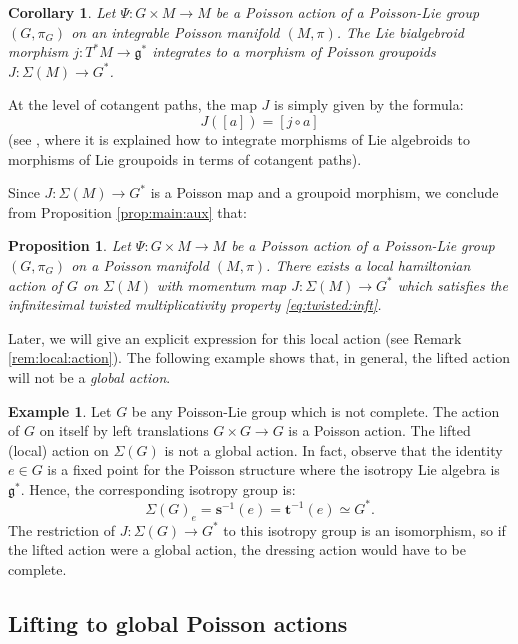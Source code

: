 \documentclass[a4paper,11pt]{amsart}
\newtheorem{prop}[thm]{Proposition}
\newtheorem{cor}[thm]{Corollary}
\theoremstyle{definition}
\newtheorem{ex}[thm]{Example}
\theoremstyle{remark}
\begin{document}
\begin{cor}
\label{cor:integ:J} Let $\Psi:G\times M\to M$ be a Poisson action
of a Poisson-Lie group $(G,\pi_G)$ on an integrable Poisson
manifold $(M,\pi)$. The Lie bialgebroid morphism $j:T^*M\to{\mathfrak{g}}^*$
integrates to a morphism of Poisson groupoids $J:\Sigma(M)\to
G^*$.
\end{cor}

At the level of cotangent paths, the map $J$ is simply given by the formula:
\[ J([a])=[j\circ a]\]
(see \cite{CrFe}, where it is explained how to integrate morphisms
of Lie algebroids to morphisms of Lie groupoids in terms of
cotangent paths).

Since $J:\Sigma(M)\to G^*$ is a Poisson map and a groupoid morphism, we conclude from Proposition \ref{prop:main:aux} that:

\begin{prop}
\label{prop:local:act}
Let $\Psi:G\times M\to M$ be a Poisson action of a Poisson-Lie
group $(G,\pi_G)$ on a Poisson manifold $(M,\pi)$. There exists a
local hamiltonian action of $G$ on $\Sigma(M)$ with momentum map
$J:\Sigma(M)\to G^*$ which satisfies the infinitesimal twisted
multiplicativity property \eqref{eq:twisted:inft}.
\end{prop}

Later, we will give an explicit expression for this local action (see Remark \ref{rem:local:action}).
The following example shows that, in general, the lifted action will not be a \emph{global action}.

\begin{ex}
Let $G$ be any Poisson-Lie group which is not complete. The action of $G$ on itself by left translations
$G\times G\to G$ is a Poisson action. The lifted (local) action on $\Sigma(G)$ is not a global action. In fact,
observe that the identity $e\in G$ is a fixed point for the Poisson structure where the isotropy Lie algebra is
${\mathfrak{g}}^*$. Hence, the corresponding isotropy group is:
\[ \Sigma(G)_e={\mathbf{s}}^{-1}(e)={\mathbf{t}}^{-1}(e)\simeq G^*.\]
The restriction of $J:\Sigma(G)\to G^*$ to this isotropy group is an isomorphism, so if the lifted action were a
global action, the dressing action would have to be complete.
\end{ex}

\subsection{Lifting to global Poisson actions}                 \label{subsec:lifted:action}                                   
\end{document}
